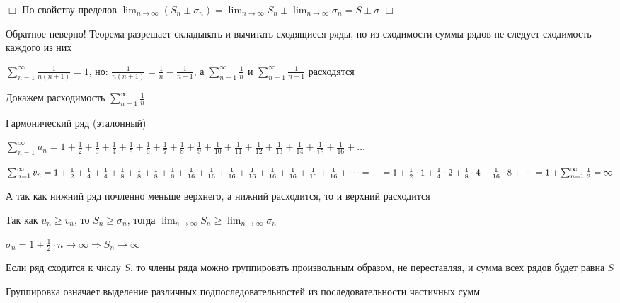 \documentclass[12pt]{article}
\begin{document}
    \begin{tcolorbox}
        $\Box$ По свойству пределов $\lim_{n \to\infty} (S_n \pm \sigma_n) = \lim_{n \to\infty} S_n \pm \lim_{n \to\infty} \sigma_n = S \pm \sigma$ $\Box$
    \end{tcolorbox}

    \Nota Обратное неверно! Теорема разрешает складывать и вычитать сходящиеся ряды, но из сходимости суммы рядов не следует сходимость каждого из них

    \Exs $\sum_{n = 1}^\infty \frac{1}{n (n + 1)} = 1$, \quad но: $\frac{1}{n (n + 1)} = \frac{1}{n} - \frac{1}{n + 1}$,
    а $\sum_{n = 1}^\infty \frac{1}{n}$ и $\sum_{n = 1}^\infty \frac{1}{n + 1}$ расходятся

    \Nota Докажем расходимость $\sum_{n = 1}^\infty \frac{1}{n}$

    \Exs Гармонический ряд (эталонный)

    $\sum_{n = 1}^\infty u_n = 1 + \frac{1}{2} + \frac{1}{3} + \frac{1}{4} + \frac{1}{5} + \frac{1}{6} + \frac{1}{7} + \frac{1}{8} + \frac{1}{9} + \frac{1}{10} + \frac{1}{11} + \frac{1}{12} + \frac{1}{13} + \frac{1}{14} + \frac{1}{15} + \frac{1}{16} + \dots$

    $\sum_{n = 1}^\infty v_n = 1 + \frac{1}{2} + \frac{1}{4} + \frac{1}{4} + \frac{1}{8} + \frac{1}{8} + \frac{1}{8} + \frac{1}{8} + \frac{1}{16} + \frac{1}{16} + \frac{1}{16} + \frac{1}{16} + \frac{1}{16} + \frac{1}{16} + \frac{1}{16} + \frac{1}{16} + \dots = \\
    \quad = 1 + \frac{1}{2} \cdot 1 + \frac{1}{4} \cdot 2 + \frac{1}{8} \cdot 4 + \frac{1}{16} \cdot 8 + \dots = 1 + \sum_{n = 1}^\infty \frac{1}{2} = \infty$

    А так как нижний ряд почленно меньше верхнего, а нижний расходится, то и верхний расходится

    Так как $u_n \geq v_n$, то $S_n \geq \sigma_n$, тогда $\lim_{n \to\infty} S_n \geq \lim_{n \to\infty} \sigma_n$

    $\sigma_n = 1 + \frac{1}{2} \cdot n \to \infty \Longrightarrow S_n \to \infty$

    \begin{MyTheorem}
         Если ряд сходится к числу $S$, то члены ряда можно группировать произвольным образом, не переставляя, и сумма всех рядов будет равна $S$

        Группировка означает выделение различных подпоследовательностей из последовательности частичных сумм
    \end{MyTheorem}
\end{document}
